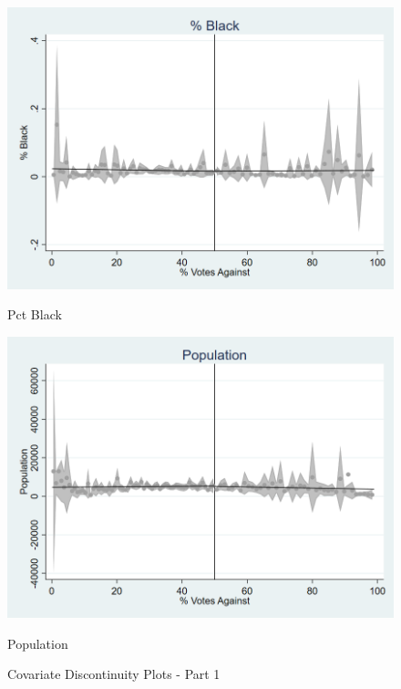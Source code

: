 \begin{figure}[ht]
    
    \begin{minipage}[b]{0.40\textwidth}
        \centering
        \includegraphics[width=\textwidth,keepaspectratio]{images/cov_smoothness_pctblack.png}
        \caption*{Pct Black}
        \label{fig:black_sm}
    \end{minipage}
    \hfill
    \begin{minipage}[b]{0.40\textwidth}
        \centering
        \includegraphics[width=\textwidth,keepaspectratio]{images/cov_smoothness_pop.png}
        \caption*{Population}
        \label{fig:pop_sm}
    \end{minipage}
    
    \caption{Covariate Discontinuity Plots - Part 1}
    \label{fig:rd_cov_smoothness_1}
\end{figure}

